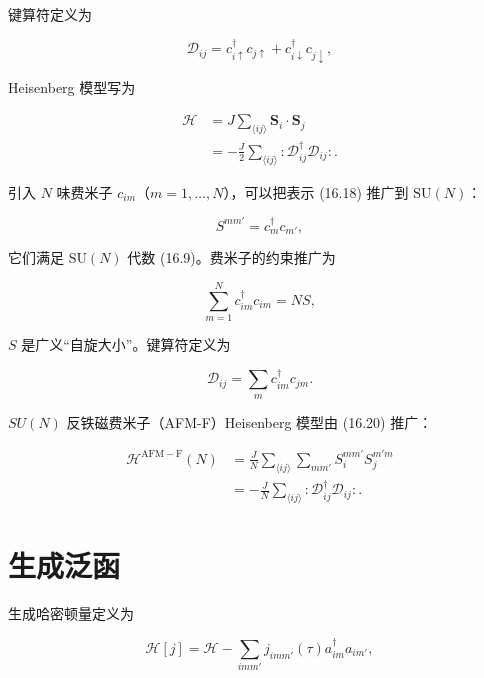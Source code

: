 键算符定义为

\begin{equation*}
\mathcal {D} _ {ij} = c _ {i \uparrow} ^ {\dagger} c _ {j \uparrow} + c _ {i \downarrow} ^ {\dagger} c _ {j \downarrow} ,
\tag{16.19}
\end{equation*}

Heisenberg 模型写为

\begin{align*}
\mathcal {H} & = J \sum_{\langle ij \rangle} \mathbf {S} _ {i} \cdot \mathbf {S} _ {j}\\
& = - \frac {J}{2} \sum_{\langle ij \rangle} : \mathcal {D} _ {ij} ^ {\dagger} \mathcal {D} _ {ij} : .
\tag{16.20}
\end{align*}

引入 $N$ 味费米子 $c_{im}$（$m = 1, \ldots, N$），可以把表示 (16.18) 推广到 $\mathrm{SU}(N)$：

\begin{equation*}
S ^ {mm '} = c _ {m} ^ {\dagger} c _ {m '} ,
\tag{16.21}
\end{equation*}

它们满足 $\mathrm{SU}(N)$ 代数 (16.9)。费米子的约束推广为

\begin{equation*}
\sum_ {m = 1} ^ {N} c _ {im} ^ {\dagger} c _ {im} = NS ,
\tag{16.22}
\end{equation*}

$S$ 是广义“自旋大小”。键算符定义为

\begin{equation*}
\mathcal {D} _ {ij} = \sum_ {m} c _ {im} ^ {\dagger} c _ {jm}.
\tag{16.23}
\end{equation*}

$SU(N)$ 反铁磁费米子（AFM-F）Heisenberg 模型由 (16.20) 推广：

\begin{align*}
\mathcal {H} ^ {\mathrm{AFM-F}} ( N ) & = \frac {J}{N} \sum_{\langle ij \rangle} \sum_ {mm '} S _ {i} ^ {mm '} S _ {j} ^ {m'm}\\
& = - \frac {J}{N} \sum_{\langle ij \rangle} : \mathcal {D} _ {ij} ^ {\dagger} \mathcal {D} _ {ij} : .
\tag{16.24}
\end{align*}

\section{生成泛函}

生成哈密顿量定义为

\begin{equation*}
\mathcal {H} [ j ] = \mathcal {H} - \sum_ {imm '} j _ {imm '} ( \tau ) a _ {im} ^ {\dagger} a _ {im '} ,
\tag{16.25}
\end{equation*}

